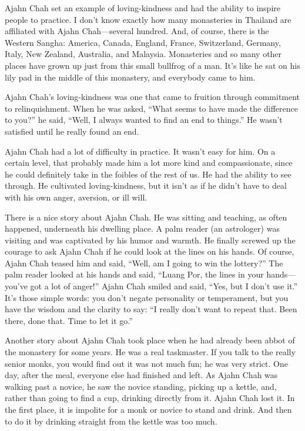 Ajahn Chah set an example of loving-kindness and had the ability to
inspire people to practice. I don’t know exactly how many monasteries in
Thailand are affiliated with Ajahn Chah—several hundred. And, of course,
there is the Western Sangha: America, Canada, England, France,
Switzerland, Germany, Italy, New Zealand, Australia, and Malaysia.
Monasteries and so many other places have grown up just from this small
bullfrog of a man. It’s like he sat on his lily pad in the middle of
this monastery, and everybody came to him.

Ajahn Chah’s loving-kindness was one that came to fruition through
commitment to relinquishment. When he was asked, “What seems to have
made the difference to you?” he said, “Well, I always wanted to find an
end to things.” He wasn’t satisfied until he really found an end.

Ajahn Chah had a lot of difficulty in practice. It wasn’t easy for him.
On a certain level, that probably made him a lot more kind and
compassionate, since he could definitely take in the foibles of the rest
of us. He had the ability to see through. He cultivated loving-kindness,
but it isn’t as if he didn’t have to deal with his own anger, aversion,
or ill will.

There is a nice story about Ajahn Chah. He was sitting and teaching, as
often happened, underneath his dwelling place. A palm reader (an
astrologer) was visiting and was captivated by his humor and warmth. He
finally screwed up the courage to ask Ajahn Chah if he could look at the
lines on his hands. Of course, Ajahn Chah teased him and said, “Well, am
I going to win the lottery?” The palm reader looked at his hands and
said, “Luang Por, the lines in your hands—you’ve got a lot of anger!”
Ajahn Chah smiled and said, “Yes, but I don’t use it.” It’s those simple
words: you don’t negate personality or temperament, but you have the
wisdom and the clarity to say: “I really don’t want to repeat that. Been
there, done that. Time to let it go.”

Another story about Ajahn Chah took place when he had already been abbot
of the monastery for some years. He was a real taskmaster. If you talk
to the really senior monks, you would find out it was not much fun; he
was very strict. One day, after the meal, everyone else had finished and
left. As Ajahn Chah was walking past a novice, he saw the novice
standing, picking up a kettle, and, rather than going to find a cup,
drinking directly from it. Ajahn Chah lost it. In the first place, it is
impolite for a monk or novice to stand and drink. And then to do it by
drinking straight from the kettle was too much.

